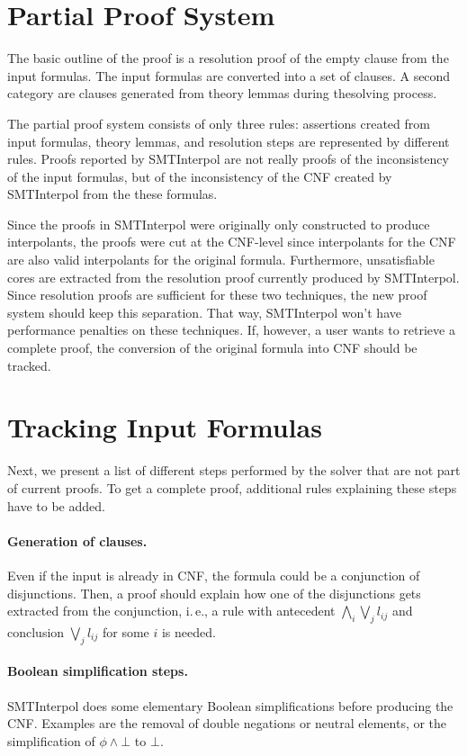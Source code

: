 \documentclass[a4paper]{article}
\newcommand\si{SMTInterpol\xspace}
\begin{document}
\section{Partial Proof System}

The basic outline of the proof is a resolution proof of the empty
clause from the input formulas.  The input formulas are converted into
a set of clauses.  A second category are clauses generated from theory
lemmas during thesolving process.

The partial proof system consists of only three rules: assertions
created from input formulas, theory lemmas, and resolution steps are
represented by different rules.  Proofs reported by \si are not really
proofs of the inconsistency of the input formulas, but of the
inconsistency of the CNF created by \si from the these formulas.

Since the proofs in \si were originally only constructed to produce
interpolants, the proofs were cut at the CNF-level since interpolants for
the CNF are also valid interpolants for the original formula.  Furthermore,
unsatisfiable cores are extracted from the resolution proof currently produced
by \si.  Since resolution proofs are sufficient for these two techniques, the
new proof system should keep this separation.  That way, \si won't have
performance penalties on these techniques.  If, however, a user wants to
retrieve a complete proof, the conversion of the original formula into CNF
should be tracked.

\section{Tracking Input Formulas}
Next, we present a list of different steps performed by the solver that are
not part of current proofs.  To get a complete proof, additional
rules explaining these steps have to be added.

\paragraph{Generation of clauses.}  Even if the input is already in CNF, the
formula could be a conjunction of disjunctions.  Then, a proof should explain
how one of the disjunctions gets extracted from the conjunction, i.\,e., a
rule with antecedent $\bigwedge_i\bigvee_j l_{ij}$ and conclusion $\bigvee_j
l_{ij}$ for some $i$ is needed.

\paragraph{Boolean simplification steps.}  \si does some elementary Boolean
simplifications before producing the CNF.  Examples are the removal of double
negations or neutral elements,  or the simplification of $\phi\land\bot$ to
$\bot$.
\end{document}
